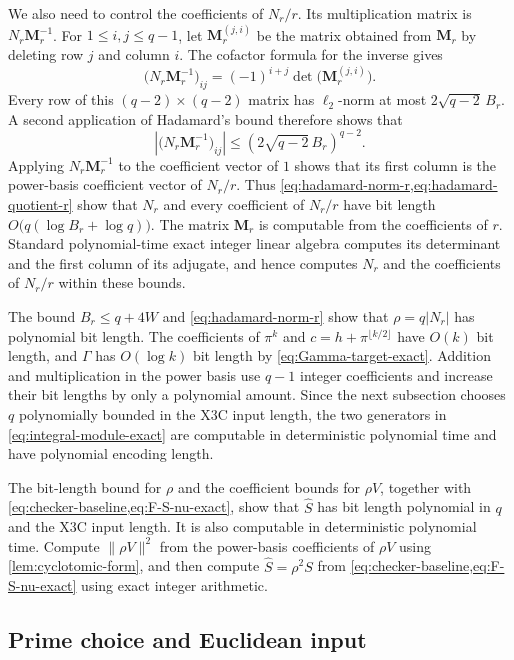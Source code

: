 We also need to control the coefficients of $N_r/r$.  Its multiplication
matrix is $N_r\mathbf M_r^{-1}$.  For $1\le i,j\le q-1$, let
$\mathbf M_r^{(j,i)}$ be the matrix obtained from $\mathbf M_r$ by deleting
row $j$ and column $i$.  The cofactor formula for the inverse gives
\[
 \bigl(N_r\mathbf M_r^{-1}\bigr)_{ij}
 =(-1)^{i+j}\det\bigl(\mathbf M_r^{(j,i)}\bigr).
\]
Every row of this $(q-2)\times(q-2)$ matrix has $\ell_2$-norm at most
$2\sqrt{q-2}\,B_r$.  A second application of Hadamard's bound therefore
shows that
\begin{equation}
\label{eq:hadamard-quotient-r}
 \left|\bigl(N_r\mathbf M_r^{-1}\bigr)_{ij}\right|
 \le\left(2\sqrt{q-2}\,B_r\right)^{q-2}.
\end{equation}
Applying $N_r\mathbf M_r^{-1}$ to the coefficient vector of $1$
shows that its first column is the power-basis coefficient vector of $N_r/r$.
Thus \cref{eq:hadamard-norm-r,eq:hadamard-quotient-r} show that
$N_r$ and every coefficient of $N_r/r$ have bit length
$O\bigl(q(\log B_r+\log q)\bigr)$.  The matrix $\mathbf M_r$ is computable
from the coefficients of $r$.  Standard polynomial-time exact integer linear
algebra computes its determinant and the first column of its adjugate, and
hence computes $N_r$ and the coefficients of $N_r/r$ within these bounds.

The bound $B_r\le q+4W$ and
\cref{eq:hadamard-norm-r} show that $\rho=q|N_r|$ has polynomial bit length.
The coefficients of $\pi^k$ and
$c=h+\pi^{\lfloor k/2\rfloor}$ have $O(k)$ bit length, and $\Gamma$ has
$O(\log k)$ bit length by \cref{eq:Gamma-target-exact}.  Addition and
multiplication in the power basis use $q-1$ integer coefficients and increase
their bit lengths by only a polynomial amount.  Since the next subsection
chooses $q$ polynomially
bounded in the X3C input length, the two generators in
\cref{eq:integral-module-exact} are computable in deterministic polynomial
time and have polynomial encoding length.

The bit-length bound for $\rho$ and the coefficient bounds for
$\rho V$, together with
\cref{eq:checker-baseline,eq:F-S-nu-exact},
show that $\widehat S$ has bit length
polynomial in $q$ and the X3C input length.
It is also computable in deterministic polynomial time.  Compute
$\|\rho V\|^2$ from the power-basis coefficients of $\rho V$ using
\cref{lem:cyclotomic-form}, and then compute $\widehat S=\rho^2S$ from
\cref{eq:checker-baseline,eq:F-S-nu-exact} using exact integer
arithmetic.

\subsection{Prime choice and Euclidean input}
\label{subsec:prime-and-euclidean}

